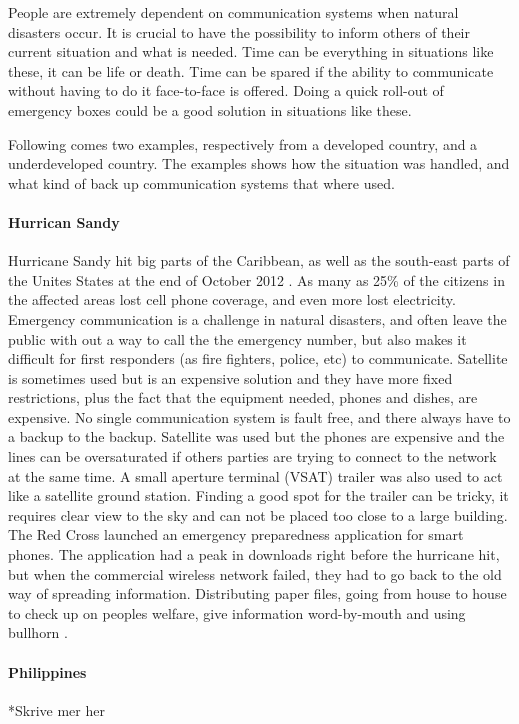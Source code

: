 People are extremely dependent on communication systems when natural disasters occur. It is crucial to have the possibility to inform others of their current situation and what is needed. Time can be everything in situations like these, it can be life or death. Time can be spared if the ability to communicate without having to do it face-to-face is offered. Doing a quick roll-out of emergency boxes could be a good solution in situations like these. 

Following comes two examples, respectively from a developed country, and a underdeveloped country. The examples shows how the situation was handled, and what kind of back up communication systems that where used. 

\paragraph{Hurrican Sandy}
Hurricane Sandy hit big parts of the Caribbean, as well as the south-east parts of the Unites States at the end of October 2012 \cite{WikiSandy}. As many as 25\% of the citizens in the affected areas lost cell phone coverage, and even more lost electricity. Emergency communication is a challenge in natural disasters, and often leave the public with out a way to call the the emergency number, but also makes it difficult for first responders (as fire fighters, police, etc) to communicate.  Satellite is sometimes used but is an expensive solution and they have more fixed restrictions, plus the fact that the equipment needed, phones and dishes, are expensive. No single communication system is fault free, and there always have to a backup to the backup. Satellite was used but the phones are expensive and the lines can be oversaturated if others parties are trying to connect to the network at the same time. A small aperture terminal (VSAT) trailer was also used to act like a satellite ground station. Finding a good spot for the trailer can be tricky, it requires clear view to the sky and can not be placed too close to a large building. The Red Cross launched an emergency preparedness application for smart phones. The application had a peak in downloads right before the hurricane hit, but when the commercial wireless network failed, they had to go back to the old way of spreading information. Distributing paper files, going from house to house to check up on peoples welfare, give information word-by-mouth and using bullhorn \cite{hurricaneSandy}.

\paragraph{Philippines}
*Skrive mer her

